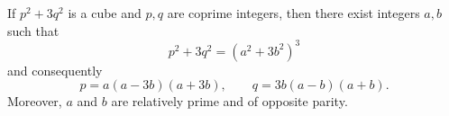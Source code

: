 If $p^2 + 3q^2$ is a cube and $p, q$ are coprime integers, then there exist integers $a, b$ such that
$$p^2 + 3q^2 = (a^2 + 3b^2)^3$$
and consequently
$$p = a(a - 3b)(a + 3b), \qquad q = 3b(a - b)(a + b).$$
Moreover, $a$ and $b$ are relatively prime and of opposite parity.
